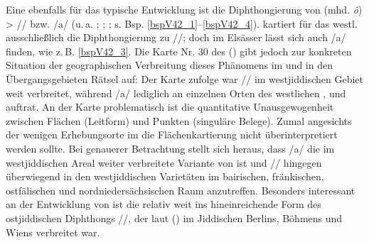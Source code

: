    Eine ebenfalls für das  typische Entwicklung ist die Diphthongierung von  (mhd.  \textit{ô}) > /\textopeno {}/ bzw. /a/ (u.\,a. \cite[167]{Timm1987}; \cite[79]{Herzog1992}; \cite[28]{Beider2010}; s. Bsp. \ref{bspV42_1}–\ref{bspV42_4}). \textcite[58f]{GuggenheimGruenberg1973} kartiert für das westl.  ausschließlich die Diphthongierung zu /\textopeno {}/; doch im Elsässer  lässt sich auch /a/ finden, wie z.\,B. \ref{bspV42_3}. Die Karte Nr. 30 des  (\citeyear[79]{Herzog1992}) gibt jedoch zur konkreten  Situation der geographischen Verbreitung dieses Phänomens im  und in den Übergangsgebieten Rätsel auf: Der Karte zufolge war /\textopeno {}/ im westjiddischen Gebiet weit verbreitet, während /a/ lediglich an einzelnen Orten des westlichen , und  auftrat. An der Karte problematisch ist die quantitative Unausgewogenheit zwischen Flächen (Leitform) und Punkten (singuläre Belege). Zumal angesichts der wenigen Erhebungsorte im  die Flächenkartierung nicht überinterpretiert werden sollte. Bei genauerer Betrachtung stellt sich heraus, dass /a/  die im westjiddischen Areal weiter verbreitete Variante von  ist und /\textopeno {}/ hingegen überwiegend in den westjiddischen Varietäten im bairischen, fränkischen, ostfälischen und nordniedersächsischen Raum anzutreffen. Besonders interessant an der Entwicklung von  ist die relativ weit ins  hineinreichende Form des ostjiddischen Diphthongs /\textopeno \textsubarch{\textsci}/, der laut  (\citeyear[79]{Herzog1992}) im Jiddischen Berlins, Böhmens und Wiens verbreitet war. \\    
   
